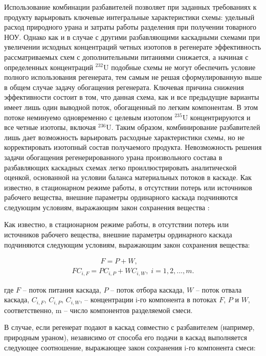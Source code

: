Использование комбинации разбавителей позволяет при заданных требованиях к продукту варьировать ключевые интегральные характеристики схемы: удельный расход природного урана и затраты работы разделения при получении товарного НОУ. Однако как и в случае с другими разбавляющими каскадными схемами при увеличении исходных концентраций четных изотопов в регенерате эффективность рассматриваемых схем с дополнительными питаниями снижается, а начиная с определенных концентраций $^{232}$U подобные схемы не могут обеспечить условие полного использования регенерата, тем самым не решая сформулированную выше в общем случае задачу обогащения регенерата. Ключевая причина снижения эффективности состоит в том, что данная схема, как и все предыдущие варианты имеет лишь один выводной поток, обогащенный по легким компонентам. В этом потоке неминуемо одновременно с целевым изотопом $^{235}$U концентрируются и все четные изотопы, включая $^{236}$U. Таким образом, комбинирование разбавителей лишь дает возможность варьировать расходные характеристики схемы, но не корректировать изотопный состав получаемого продукта.
Невозможность решения задачи обогащения регенерированного урана произвольного состава в разбавляющих каскадных схемах легко проиллюстрировать аналитической оценкой, основанной на условии баланса материальных потоков в каскаде. 
Как известно, в стационарном режиме работы, в отсутствии потерь или источников рабочего вещества, внешние параметры ординарного каскада подчиняются следующим условиям, выражающим закон сохранения вещества \cite{sulaberidzeTeoriyaKaskadovDlya2011}:


Как известно, в стационарном режиме работы, в отсутствии потерь или источников рабочего вещества, внешние параметры ординарного каскада подчиняются следующим условиям, выражающим закон сохранения вещества:
				  
\begin{equation} \label{EQ__1} 
  \begin{array}{l} {\quad \quad \quad \quad F=P+W,} \\ {FC_{i,F} =PC_{i,P} +WC_{i,W} ,\; i=1,2,...,m.} \end{array} 
\end{equation} 


где $F$ -- поток питания каскада, $P$ -- поток отбора каскада, $W$ -- поток отвала каскада, $C_{i,F}$, $C_{i,P}$, $C_{i,W}$, -- концентрации i-го компонента в потоках $F$, $P$ и $W$, соответственно, m -- число компонентов разделяемой смеси.

В случае, если регенерат подают в каскад совместно с разбавителем (например, природным ураном), независимо от способа его подачи в каскад выполняется следующее соотношение, выражающее закон сохранения i-го компонента смеси:

